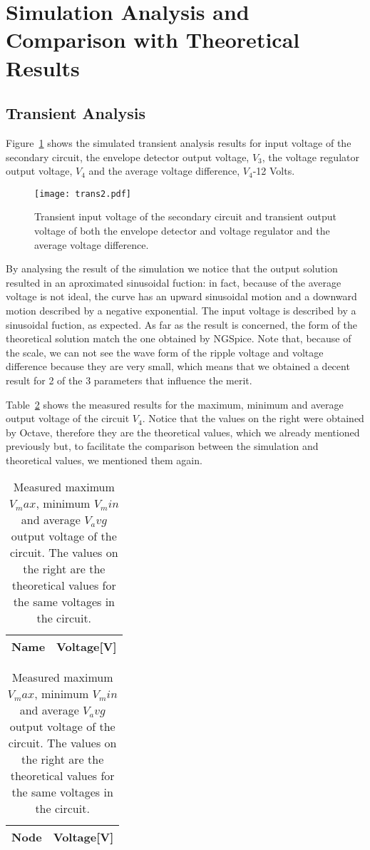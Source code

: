 \section{Simulation Analysis and Comparison with Theoretical Results}
\label{sec:simulation}

\subsection{Transient Analysis}


Figure~\ref{fig:trans2} shows the simulated transient analysis results for input voltage of the secondary circuit,
the envelope detector output voltage, $V_3$, the voltage regulator output voltage, $V_4$ 
and the average voltage difference, $V_4$-12 Volts.

\begin{figure}[H] \centering
\texttt{[image: trans2.pdf]}
\caption{Transient input voltage of the secondary circuit and transient output voltage of both the envelope detector and 
voltage regulator and the average voltage difference.}
\label{fig:trans2}
\end{figure}

By analysing the result of the simulation we notice that the output solution resulted in an aproximated sinusoidal 
fuction: in fact, because of the average voltage is not ideal, the curve has an upward sinusoidal motion and 
a downward motion described by a negative exponential. The input voltage is described by a sinusoidal fuction, as expected. 
As far as the result is concerned, the form of the theoretical solution match the one obtained by NGSpice. 
Note that, because of the scale, we can not see the wave form of the ripple voltage and voltage difference because 
they are very small, which means that we obtained a decent result for 2 of the 3 parameters that influence the merit.


	Table~\ref{tab1:op} shows the measured results for the maximum, minimum and average output voltage of the circuit $V_4$. 
	Notice that the values on the right were obtained by Octave, therefore they are the theoretical values, which we already 
	mentioned previously but, to facilitate the comparison between the simulation and theoretical values, we mentioned them again.

\begin{table}[H]
  \centering
  \begin{tabular}{|l|r|}
    \hline    
    {\bf Name} & {\bf Voltage[V]} \\ \hline
    
  \end{tabular}
  \begin{tabular}{|l|r|}
    \hline    
    {\bf Node} & {\bf Voltage[V]} \\ \hline
    
  \end{tabular}
  \caption {Measured maximum $V_max$, minimum $V_min$ and average $V_avg$ output voltage of the circuit. 
  The values on the right are the theoretical values for the same voltages in the circuit.}
  \label{tab1:op}
\end{table}


